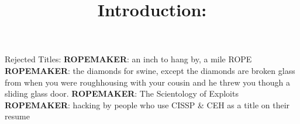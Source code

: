 \documentclass[10pt,a4paper]{article}
\begin{document}
	\centering\Huge{Rejected Titles:}
	\vspace{30 mm}
	\linebreak
	\large{\textbf{ROPEMAKER}: an inch to hang by, a mile ROPE}
	\vspace{10 mm}
	\linebreak	
	\large{\textbf{ROPEMAKER}: the diamonds for swine, except the diamonds are broken glass from when you were roughhousing with your cousin and he threw you though a sliding glass door.}
	\vspace{10 mm}
	\linebreak
	\large{\textbf{ROPEMAKER}: The Scientology of Exploits}
	\vspace{10 mm}
	\linebreak
	\large{\textbf{ROPEMAKER}: hacking by people who use CISSP \& CEH as a title on their resume}
	\vspace{10 mm}
	\vfill
	\pagebreak
	\title{\huge{Introduction:}}
	\vspace{10 mm}
\end{document}
